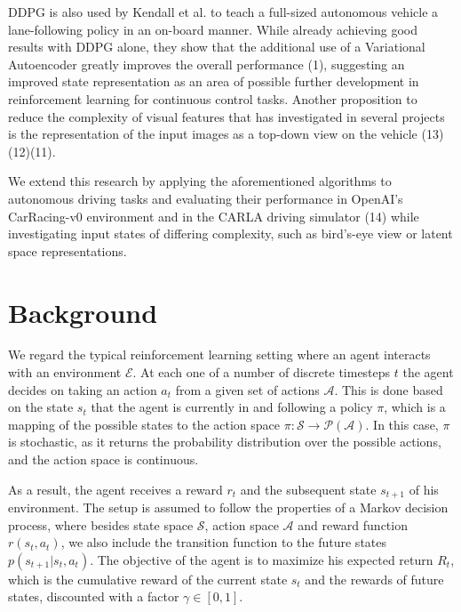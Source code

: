 \documentclass[letterpaper, 10 pt, conference]{ieeeconf}  %
\begin{document}
DDPG is also used by Kendall et al. to teach a full-sized autonomous vehicle a lane-following policy in an on-board manner. While already achieving good results with DDPG alone, they show that the additional use of a Variational Autoencoder greatly improves the overall performance (1), suggesting an improved state representation as an area of possible further development in reinforcement learning for continuous control tasks. Another proposition to reduce the complexity of visual features that has investigated in several projects is the representation of the input images as a top-down view on the vehicle (13)(12)(11).

We extend this research by applying the aforementioned algorithms to autonomous driving tasks and evaluating their performance in OpenAI's CarRacing-v0 environment and in the CARLA driving simulator (14) while investigating input states of differing complexity, such as bird's-eye view or latent space representations.


\section{Background}

We regard the typical reinforcement learning setting where an agent interacts with an environment $\mathcal{E}$. At each one of a number of discrete timesteps $t$ the agent decides on taking an action $a_t$ from a given set of actions $\mathcal{A}$. This is done based on the state $s_t$ that the agent is currently in and following a policy $\pi$, which is a mapping of the possible states to the action space $\pi: \mathcal{S} \rightarrow \mathcal{P}(\mathcal{A})$. In this case, $\pi$ is stochastic, as it returns the probability distribution over the possible actions, and the action space is continuous.

As a result, the agent receives a reward $r_t$ and the subsequent state $s_{t+1}$ of his environment. The setup is assumed to follow the properties of a Markov decision process, where besides state space $\mathcal{S}$, action space $\mathcal{A}$ and reward function $r(s_t,a_t)$, we also include the transition function to the future states $p(s_{t+1}|s_t,a_t)$. The objective of the agent is to maximize his expected return $R_t$, which is the cumulative reward of the current state $s_t$ and the rewards of future states, discounted with a factor $\gamma \in [0,1]$.
\end{document}
